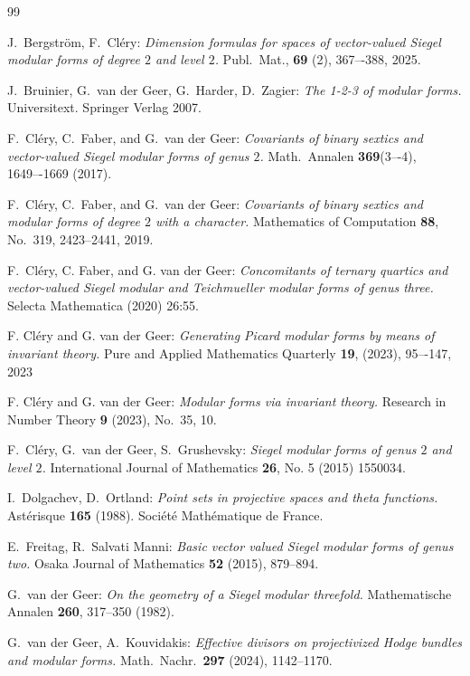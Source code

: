 \documentclass[12pt]{amsart}
\numberwithin{equation}{section}
\numberwithin{equation}{section}
\theoremstyle{definition}
\theoremstyle{remark}
\begin{document}
\begin{thebibliography}{99}

 J.\ Bergstr\"om, F.\ Cl\'ery:
{\sl Dimension formulas for spaces of vector-valued Siegel modular forms of degree $2$
and level $2$.} Publ.\ Mat., \textbf{69} (2), 367–-388, 2025.

 J.\ Bruinier, G.\ van der Geer, G.\ Harder, D.\ Zagier:
{\sl The 1-2-3 of modular forms.} Universitext. Springer Verlag 2007.

 F.\ Cl\'ery, C.\ Faber, and G.\ van der Geer:
{\sl Covariants of binary sextics and vector-valued Siegel modular
forms of genus $2$.} Math.\ Annalen \textbf{369}(3–-4), 1649–-1669
(2017).

 F.\ Cl\'ery, C.\ Faber, and G.\ van der Geer:
{\sl Covariants of binary sextics and modular forms of degree $2$ with a character.}
Mathematics of Computation  \textbf{88}, No.\ 319, 2423--2441, 2019.

 F.\ Cl\'ery, C. Faber, and G. van der Geer:
{\sl Concomitants of ternary quartics and vector-valued Siegel modular
and Teichmueller modular forms of genus three.}
Selecta Mathematica (2020) 26:55.

 F. Cl\'ery and G. van der Geer:
{\sl Generating Picard modular forms by means of invariant theory.}
Pure and Applied Mathematics Quarterly
\textbf{19}, (2023), 95–-147, 2023

 F. Cl\'ery and G. van der Geer:
{\sl Modular forms via invariant theory.}
Research in Number Theory \textbf{9} (2023), No.\ 35, 10.

 F.\ Cl\'ery, G.\ van der Geer,
S.\ Grushevsky: 
{\sl Siegel modular forms of genus $2$ and level $2$.}
International Journal of Mathematics \textbf{26}, No. 5 (2015) 1550034. 

 I.\ Dolgachev, D.\ Ortland:
{\sl Point sets in projective spaces and theta functions.}
Ast\'erisque \textbf{165} (1988). Soci\'et\'e Math\'ematique de France.

E.\ Freitag, R.\ Salvati Manni:
{\sl Basic vector valued {S}iegel modular forms of genus two.}
Osaka Journal of Mathematics \textbf{52} (2015), 879--894.

 G.\ van der Geer:
{\sl On the geometry of a Siegel modular threefold.}
Mathematische Annalen \textbf{260}, 317--350 (1982).

 G.\ van der Geer, A.\ Kouvidakis:
{\sl Effective divisors on projectivized Hodge bundles and modular forms.}
Math.\ Nachr.\  \textbf{297} (2024), 1142--1170.



\end{thebibliography}
\end{document}
